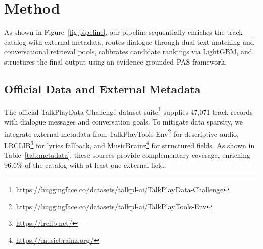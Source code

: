\section{Method}

As shown in Figure~\ref{fig:pipeline}, our pipeline sequentially enriches the track catalog with external metadata, routes dialogue through dual text-matching and conversational retrieval pools, calibrates candidate rankings via LightGBM, and structures the final output using an evidence-grounded PAS framework.

\subsection{Official Data and External Metadata}

The official TalkPlayData-Challenge dataset suite\footnote{\url{https://huggingface.co/datasets/talkpl-ai/TalkPlayData-Challenge}} supplies 47,071 track records with dialogue messages and conversation goals. To mitigate data sparsity, we integrate external metadata from TalkPlayTools\allowbreak-Env\footnote{\url{https://huggingface.co/datasets/talkpl-ai/TalkPlayTools-Env}} for descriptive audio, LRCLIB\footnote{\url{https://lrclib.net/}} for lyrics fallback, and MusicBrainz\footnote{\url{https://musicbrainz.org/}} for structured fields. As shown in Table~\ref{tab:metadata}, these sources provide complementary coverage, enriching 96.6\% of the catalog with at least one external field.

